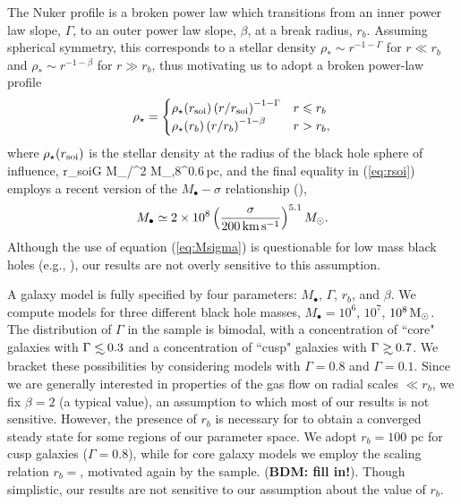 \documentclass[usenatbib,fleqn]{mn2e}
\newcommand\lsim{\mathrel{\rlap{\lower4pt\hbox{\hskip1pt$\sim$}}
    \raise1pt\hbox{$<$}}}
\newcommand\gsim{\mathrel{\rlap{\lower4pt\hbox{\hskip1pt$\sim$}}
    \raise1pt\hbox{$>$}}}
\newcommand{\rb}{r_b}
\newcommand{\rhostar}{\rho_*}
\newcommand{\Mbh}[1][]{M_{\bullet#1}}
\newcommand{\soi}{\rm soi}
\newcommand{\rsoi}{r_{\soi}}
\begin{document}
The Nuker profile is a broken power law which transitions from an inner power law slope, $\Gamma$, to an outer power law slope, $\beta$, at a break radius, $\rb$.  Assuming spherical symmetry, this corresponds to a stellar density $\rhostar \sim r^{-1-\Gamma}$ for $r \ll \rb$ and $\rhostar\sim r^{-1-\beta}$ for $r \gg \rb$, thus motivating us to adopt a broken power-law profile
\begin{align}
\rho_\star = 
\begin{cases}
\rho_\star(\rsoi) \left(r/\rsoi\right)^{-1-\Gamma} & r \leq r_b\\
\rho_\star(r_b) \left(r/r_b\right)^{-1-\beta} & r > r_b,
\label{eq:rhostar}
\end{cases}
\end{align}
where $\rho_\star(\rsoi)$ is the stellar density at the radius of the black hole sphere of influence, 
\be
\rsoi \simeq G \Mbh/\sigma^2  M_{\bullet,8}^{0.6}\,{\rm pc},
\label{eq:rsoi}
\ee
and the final equality in (\ref{eq:rsoi}) employs a recent version of the $\Mbh-\sigma$ relationship (\citealt{Gultekin+09}),
 \begin{align}
M_{\bullet} \simeq 2\times 10^{8}\left(\frac{\sigma}{200\,{\rm
      km\,s^{-1}}}\right)^{5.1}M_{\odot}.
\label{eq:Msigma}
\end{align}
Although the use of equation (\ref{eq:Msigma}) is questionable for low mass black holes (e.g., \citealt{Greene&Ho07}), our results are not overly sensitive to this assumption.  

A galaxy model is fully specified by four parameters: $\Mbh$, $\Gamma$, $r_b$,
and $\beta$.  We compute models for three different black hole masses, $\Mbh = 10^6$, $10^7$, $10^8 \,{\rm M_\odot}$.  The distribution of $\Gamma$ in the \citet{LauerFaber+:2007a} sample is bimodal, with a concentration of ``core" galaxies with $\Gamma \lsim 0.3$ and a concentration of ``cusp" galaxies with $\Gamma \gsim 0.7$.  We bracket these possibilities by considering models with $\Gamma=0.8$ and $\Gamma=0.1$.  Since we are generally interested in properties of the gas flow on radial scales $\ll r_b$, we fix $\beta = 2$ (a typical value), an assumption to which most of our results is not sensitive.  However, the presence of $\rb$ is necessary for to obtain a converged steady state for some regions of our parameter space. We adopt $\rb=100$ pc for cusp galaxies ($\Gamma=0.8$), while for core galaxy models we employ the scaling relation $\rb = $, motivated again by the \citet{LauerFaber+:2007a} sample. ({\bf BDM: fill in!}).  Though simplistic, our results are not sensitive to our assumption about the value of $\rb$.
\end{document}
